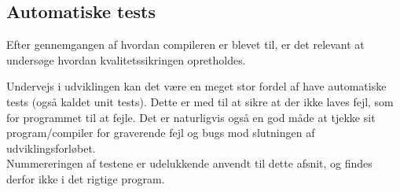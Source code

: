 \subsection{Automatiske tests}
Efter gennemgangen af hvordan compileren er blevet til, er det relevant at undersøge hvordan kvalitetssikringen opretholdes.

\noindent Undervejs i udviklingen kan det være en meget stor fordel af have automatiske tests (også kaldet unit tests). Dette er med til at sikre at der ikke laves fejl, som for programmet til at fejle. Det er naturligvis også en god måde at tjekke sit program/compiler for graverende fejl og bugs mod slutningen af udviklingsforløbet.\\

\noindent Nummereringen af testene er udelukkende anvendt til dette afsnit, og findes derfor ikke i det rigtige program.


